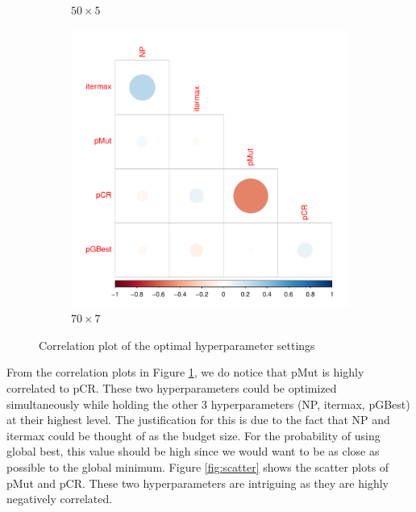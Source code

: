 \documentclass [PhD] {package/uclathes}
\begin{document}
\begin{figure}
\begin{subfigure}[b]{0.3\textwidth}
\caption{$50\times 5$}
\end{subfigure}
\begin{subfigure}[b]{0.3\textwidth}
\centering
\includegraphics{chapters/RSO/pdfs/corplot70_1}
\caption{$70\times 7$}
\end{subfigure}
\caption{Correlation plot of the optimal hyperparameter settings}
\label{fig:correlation}
\end{figure}

From the correlation plots in Figure \ref{fig:correlation}, we do notice that  pMut is highly correlated to pCR. These two hyperparameters could be optimized simultaneously while holding the other 3 hyperparameters (NP, itermax, pGBest) at their highest level. The justification for this is due to the fact that NP and  itermax could be thought of as the budget size. For the probability of using global best, this value should be high since we would want to be as close as possible to the global minimum. Figure \ref{fig:scatter} shows the scatter plots of pMut and pCR. These two hyperparameters are intriguing as they are highly negatively correlated. %
\end{document}
